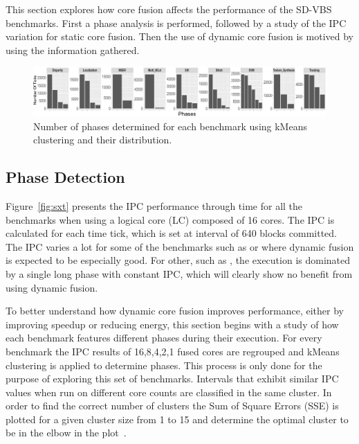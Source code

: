 This section explores how core fusion affects the performance of the SD-VBS benchmarks.
First a phase analysis is performed, followed by a study of the IPC variation for static core fusion.
Then the use of dynamic core fusion is motived by using the information gathered.


\begin{figure}[t]
    \centering
    \includegraphics[width=1\textwidth]{cases-paper/graphics/Exploration/clusters2.pdf}
    \caption{Number of phases determined for each benchmark using kMeans clustering and their distribution.}
    \label{fig:clust}
		\vspace{5mm}
\end{figure}


\subsection{Phase Detection}
Figure~\ref{fig:sxt} presents the IPC performance through time for all the benchmarks when using a logical core (LC) composed of 16 cores.
The IPC is calculated for each time tick, which is set at interval of 640 blocks committed.
The IPC varies a lot for some of the benchmarks such as  or  where dynamic fusion is expected to be especially good.
For other, such as , the execution is dominated by a single long phase with constant IPC, which will clearly show no benefit from using dynamic fusion.

To better understand how dynamic core fusion improves performance, either by improving speedup or reducing energy, this section begins with a study of how each benchmark features different phases during their execution.
For every benchmark the IPC results of 16,8,4,2,1 fused cores are regrouped and kMeans clustering is applied to determine phases.
This process is only done for the purpose of exploring this set of benchmarks.
Intervals that exhibit similar IPC values when run on different core counts are classified in the same cluster.
In order to find the correct number of clusters the Sum of Square Errors (SSE) is plotted for a given cluster size from 1 to 15 and determine the optimal cluster to be in the elbow in the plot~\cite{everitCluster2001}.


